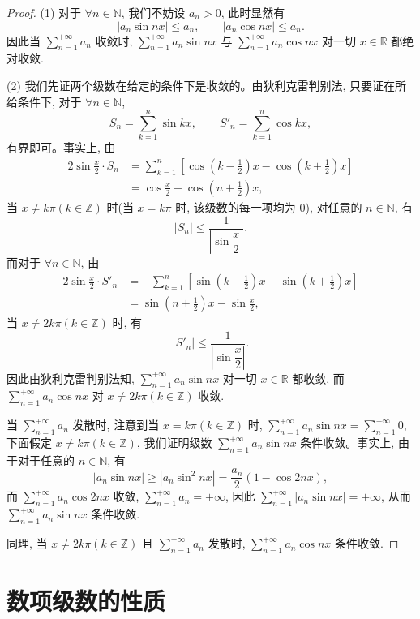\begin{proof}
(1) 对于 $\forall n\in\mathbb{N}$, 我们不妨设 $a_n>0$, 此时显然有
\[
  |a_n\sin nx|\leq a_n,\qquad |a_n\cos nx|\leq a_n.
\]
因此当 $\sum\limits_{n=1}^{+\infty}a_n$ 收敛时, $\sum\limits_{n=1}^{+\infty}a_n\sin nx$ 与 $\sum\limits_{n=1}^{+\infty}a_n\cos nx$ 对一切 $x\in\mathbb{R}$ 都绝对收敛.

(2) 我们先证两个级数在给定的条件下是收敛的。由狄利克雷判别法, 只要证在所给条件下, 对于 $\forall n\in\mathbb{N}$,
\[
  S_n=\sum_{k=1}^n\sin kx,\qquad S'_n=\sum_{k=1}^n\cos kx,
\]
有界即可。事实上, 由
\[
\begin{aligned}
  2\sin\frac{x}{2}\cdot S_n
  &=\sum_{k=1}^n\left[\cos\left(k-\frac12\right)x-\cos\left(k+\frac12\right)x\right]\\
  &=\cos\frac{x}{2}-\cos\left(n+\frac12\right)x,
\end{aligned}
\]
当 $x\neq k\pi(k\in\mathbb{Z})$ 时(当 $x=k\pi$ 时, 该级数的每一项均为 0), 对任意的 $n\in\mathbb{N}$, 有
\[
  |S_n|\leq\frac1{\left|\sin\dfrac{x}{2}\right|}.
\]
而对于 $\forall n\in\mathbb{N}$, 由
\[
\begin{aligned}
  2\sin\frac{x}{2}\cdot S'_n
  &=-\sum_{k=1}^n\left[\sin\left(k-\frac12\right)x-\sin\left(k+\frac12\right)x\right]\\
  &=\sin\left(n+\frac12\right)x-\sin\frac{x}{2},
\end{aligned}
\]
当 $x\neq2k\pi(k\in\mathbb{Z})$ 时, 有
\[
  |S'_n|\leq\frac1{\left|\sin\dfrac{x}{2}\right|}.
\]
因此由狄利克雷判别法知, $\sum\limits_{n=1}^{+\infty}a_n\sin nx$ 对一切 $x\in\mathbb{R}$ 都收敛, 而 $\sum\limits_{n=1}^{+\infty}a_n\cos nx$ 对 $x\neq2k\pi(k\in\mathbb{Z})$ 收敛.

当 $\sum\limits_{n=1}^{+\infty}a_n$ 发散时, 注意到当 $x=k\pi(k\in\mathbb{Z})$ 时, $\sum\limits_{n=1}^{+\infty}a_n\sin nx=\sum\limits_{n=1}^{+\infty}0$, 下面假定 $x\neq k\pi(k\in\mathbb{Z})$, 我们证明级数 $\sum\limits_{n=1}^{+\infty}a_n\sin nx$ 条件收敛。事实上, 由于对于任意的 $n\in\mathbb{N}$, 有
\[
  |a_n\sin nx|\geq |a_n\sin^2 nx|=\frac{a_n}{2}(1-\cos2nx),
\]
而 $\sum\limits_{n=1}^{+\infty}a_n\cos2nx$ 收敛, $\sum\limits_{n=1}^{+\infty}a_n=+\infty$, 因此 $\sum\limits_{n=1}^{+\infty}|a_n\sin nx|=+\infty$, 从而 $\sum\limits_{n=1}^{+\infty}a_n\sin nx$ 条件收敛.

同理, 当 $x\neq2k\pi(k\in\mathbb{Z})$ 且 $\sum\limits_{n=1}^{+\infty}a_n$ 发散时, $\sum\limits_{n=1}^{+\infty}a_n\cos nx$ 条件收敛.
\end{proof}


\section{数项级数的性质}
\label{sec:ma-9-4}

